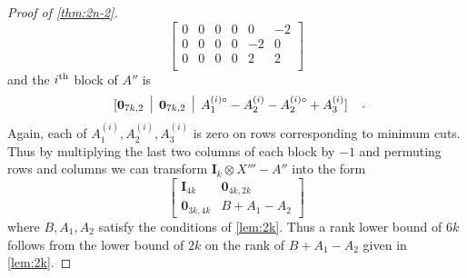 \documentclass[10pt,a4paper]{article}
\newcommand{\zero}{\mathbf{0}}
\newcommand{\Id}{\mathbf{I}}
\newcommand{\ith}{i^{\scriptsize \mbox{{\rm th}}}}
\newcommand{\1}{\mathbf{1}}
\theoremstyle{definition}
\begin{document}
\begin{proof}[Proof of \cref{thm:2n-2}]
\[\begin{bmatrix}
0 &  0 &  0 &  0 &  0 &  -2 \\
0 &  0 &  0 &  0 &  -2 &  0 \\
0 &  0 &  0 &  0 &  2 &  2 \\
\end{bmatrix}
\]
and the $\ith$ block of $A''$ is
\[
\begin{tabular}{c|c|c}
$[\zero_{7k,2}$ & $\zero_{7k,2}$ & $A_1^{(i)\circ} -A_2^{(i)} - A_2^{(i)\circ} + A_3^{(i)}]$
\end{tabular}
\enspace.
\]
Again, each of $A_1^{(i)}, A_2^{(i)}, A_3^{(i)}$ is zero on rows corresponding to minimum cuts.  Thus by multiplying the last two columns of
each block by $-1$ and permuting rows and columns we can transform $\Id_k \otimes X''' - A''$ into the form
\[
\begin{bmatrix}
\Id_{4k} & \zero_{4k,2k} \\
\zero_{3k,4k} & B +A_1 - A_2
\end{bmatrix}
\]
where $B,A_1, A_2$ satisfy the conditions of \cref{lem:2k}.  Thus a rank lower bound of $6k$ follows from the lower
bound of $2k$ on the rank of $B+A_1-A_2$ given in \cref{lem:2k}.
\end{proof}

%
\end{document}
